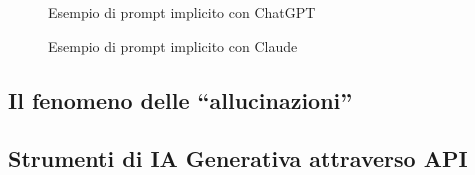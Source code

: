         \begin{figure}
            \centering
            \missingfigure{}
            \caption{Esempio di prompt implicito con ChatGPT}
            \label{fig:prompt_impicito_chatgpt}
        \end{figure}

        \begin{figure}
            \centering
            \missingfigure{}
            \caption{Esempio di prompt implicito con Claude}
            \label{fig:prompt_impicito_claude}
        \end{figure}
        
    \subsection{Il fenomeno delle ``allucinazioni''}
        
    \subsection{Strumenti di IA Generativa attraverso API}
